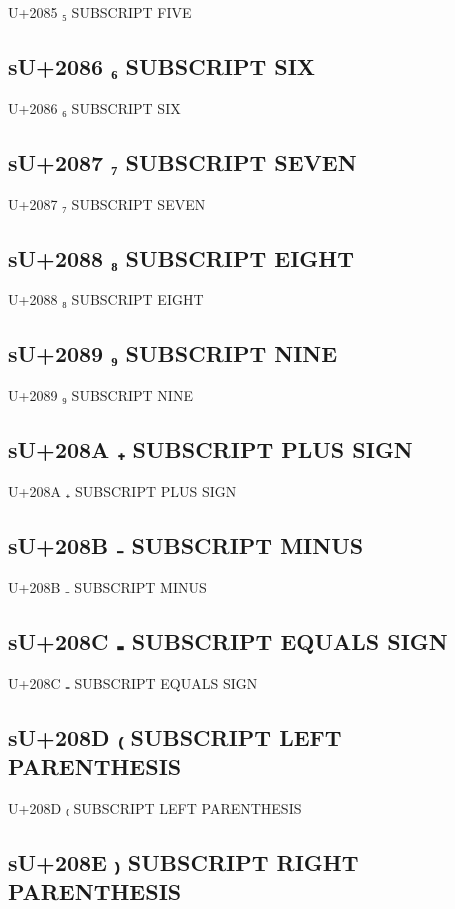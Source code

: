 U+2085 ₅ SUBSCRIPT FIVE

\subsection{sU+2086 ₆ SUBSCRIPT SIX}

U+2086 ₆ SUBSCRIPT SIX

\subsection{sU+2087 ₇ SUBSCRIPT SEVEN}

U+2087 ₇ SUBSCRIPT SEVEN

\subsection{sU+2088 ₈ SUBSCRIPT EIGHT}

U+2088 ₈ SUBSCRIPT EIGHT

\subsection{sU+2089 ₉ SUBSCRIPT NINE}

U+2089 ₉ SUBSCRIPT NINE

\subsection{sU+208A ₊ SUBSCRIPT PLUS SIGN}

U+208A ₊ SUBSCRIPT PLUS SIGN

\subsection{sU+208B ₋ SUBSCRIPT MINUS}

U+208B ₋ SUBSCRIPT MINUS

\subsection{sU+208C ₌ SUBSCRIPT EQUALS SIGN}

U+208C ₌ SUBSCRIPT EQUALS SIGN

\subsection{sU+208D ₍ SUBSCRIPT LEFT PARENTHESIS}

U+208D ₍ SUBSCRIPT LEFT PARENTHESIS

\subsection{sU+208E ₎ SUBSCRIPT RIGHT PARENTHESIS}

